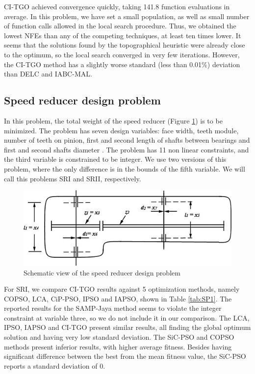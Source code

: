 CI-TGO achieved convergence quickly, taking 141.8 function evaluations in average. In this problem, we have set a small population, as well as small number of function calls allowed in the local search procedure. Thus, we obtained the lowest NFEs than any of the competing techniques, at least ten times lower. It seems that the solutions found by the topographical heuristic were already close to the optimum, so the local search converged in very few iterations. However, the CI-TGO method has a slightly worse standard (less than 0.01\%) deviation than DELC and IABC-MAL.





\subsection{Speed reducer design problem}

In this problem, the total weight of the speed reducer (Figure \ref{fig:SR}) is to be minimized. The problem has seven design variables: face width, teeth module, number of teeth on pinion, first and second length of shafts between bearings and first and second shafts diameter \citep{SR}. The problem has 11 non linear constraints, and the third variable is constrained to be integer. We use two versions of this problem, where the only difference is in the bounds of the fifth variable. We will call this problems SRI and SRII, respectively.


\begin{figure}[h]
\begin{center}
\includegraphics[scale=0.6]{Imgs/SR.jpg}
\end{center}
\captionsetup{justification=centering}
\caption{Schematic view of the speed reducer design problem}\label{fig:SR}
\end{figure}

For SRI, we compare CI-TGO results against 5 optimization methods, namely COPSO, LCA, CiP-PSO, IPSO and IAPSO, shown in Table \ref{tab:SP1}. The reported results for the SAMP-Jaya method seems to violate the integer constraint at variable three, so we do not include it in our comparison. The LCA, IPSO, IAPSO and CI-TGO present similar results, all finding the global optimum solution and having very low standard deviation. The SiC-PSO and COPSO methods present inferior results, with higher average fitness. Besides having significant difference between the best from the mean fitness value, the SiC-PSO reports a standard deviation of 0.

